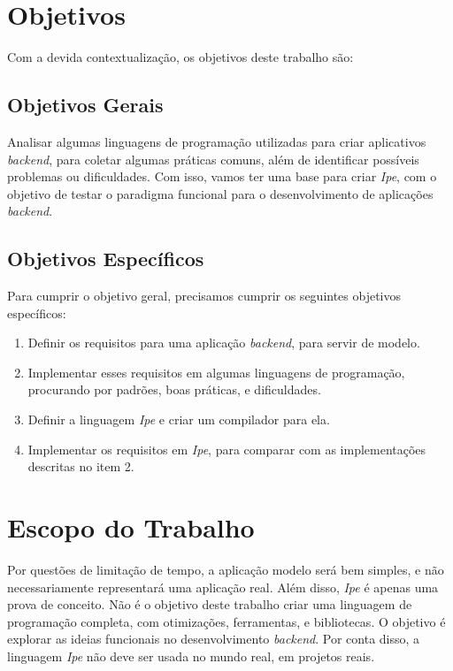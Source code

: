 \section{Objetivos}\label{sec:objectives}

Com a devida contextualização, os objetivos deste trabalho são:

\subsection{Objetivos Gerais}

Analisar algumas linguagens de programação utilizadas para criar aplicativos
\textit{backend}, para coletar algumas práticas comuns, além de identificar
possíveis problemas ou dificuldades. Com isso, vamos ter uma base
para criar \textit{Ipe}, com o objetivo de testar o paradigma funcional para o
desenvolvimento de aplicações \textit{backend}.

\subsection{Objetivos Específicos}

Para cumprir o objetivo geral, precisamos cumprir os seguintes objetivos específicos:

\begin{enumerate}
      \item Definir os requisitos para uma aplicação \textit{backend}, para servir
            de modelo.
      \item Implementar esses requisitos em algumas linguagens de programação,
            procurando por padrões, boas práticas, e dificuldades.
      \item Definir a linguagem \textit{Ipe} e criar um compilador para ela.
      \item Implementar os requisitos em \textit{Ipe}, para comparar com as
            implementações descritas no item 2.
\end{enumerate}


\section{Escopo do Trabalho}

Por questões de limitação de tempo, a aplicação modelo será bem simples, e não
necessariamente representará uma aplicação real. Além disso, \textit{Ipe} é apenas
uma prova de conceito. Não é o objetivo deste trabalho criar uma linguagem de
programação completa, com otimizações, ferramentas, e bibliotecas. O objetivo é
explorar as ideias funcionais no desenvolvimento \textit{backend}. Por conta disso,
a linguagem \textit{Ipe} não deve ser usada no mundo real, em projetos reais.

